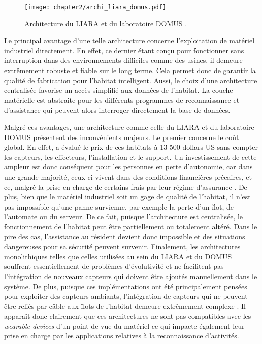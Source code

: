 \begin{figure}[H]
	\centering
	\texttt{[image: chapter2/archi\_liara\_domus.pdf]}
	\caption[Architecture du \acs{LIARA} et du laboratoire \acs{DOMUS}.]{Architecture du \acs{LIARA} \citep{Bouchard2014} et du laboratoire \acs{DOMUS} \citep{Giroux2009}.}
	\label{fig:archi_liara_domus}
\end{figure}

Le principal avantage d'une telle architecture concerne l'exploitation de matériel industriel directement. En effet, ce dernier étant conçu pour fonctionner sans interruption dans des environnements difficiles comme des usines, il demeure extrêmement robuste et fiable sur le long terme. Cela permet donc de garantir la qualité de fabrication pour l'habitat intelligent. Aussi, le choix d'une architecture centralisée favorise un accès simplifié aux données de l'habitat. La couche matérielle est abstraite pour les différents programmes de reconnaissance et d'assistance qui peuvent alors interroger directement la base de données.

Malgré ces avantages, une architecture comme celle du \acs{LIARA} et du laboratoire \acs{DOMUS} présentent des inconvénients majeurs. Le premier concerne le coût global. En effet, \cite{Plantevin2018a} a évalué le prix de ces habitats à 13 500 dollars US sans compter les capteurs, les effecteurs, l'installation et le support. Un investissement de cette ampleur est donc conséquent pour les personnes en perte d'autonomie, car dans une grande majorité, ceux-ci vivent dans des conditions financières précaires, et ce, malgré la prise en charge de certains frais par leur régime d'assurance \citep{AlzheimersAssociation2018}. De plus, bien que le matériel industriel soit un gage de qualité de l'habitat, il n'est pas impossible qu'une panne survienne, par exemple la perte d'un îlot, de l'automate ou du serveur. De ce fait, puisque l'architecture est centralisée, le fonctionnement de l'habitat peut être partiellement ou totalement altéré. Dans le pire des cas, l'assistance au résident devient donc impossible et des situations dangereuses pour sa sécurité peuvent survenir. Finalement, les architectures monolithiques telles que celles utilisées au sein du \acs{LIARA} et du \acs{DOMUS} souffrent essentiellement de problèmes d'évolutivité et ne facilitent pas l'intégration de nouveaux capteurs qui doivent être ajoutés manuellement dans le système. De plus, puisque ces implémentations ont été principalement pensées pour exploiter des capteurs ambiants, l'intégration de capteurs qui ne peuvent être reliés par câble aux îlots de l'habitat demeure extrêmement complexe \citep{Plantevin2018a}. Il apparaît donc clairement que ces architectures ne sont pas compatibles avec les \textit{wearable devices} d'un point de vue du matériel ce qui impacte également leur prise en charge par les applications relatives à la reconnaissance d'activités.

